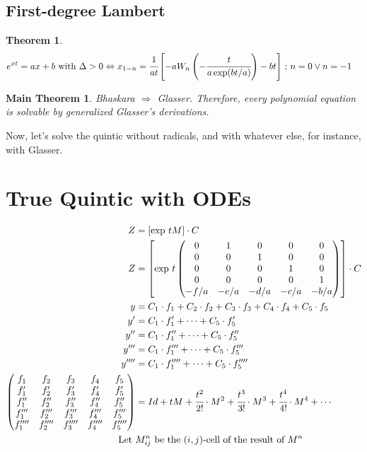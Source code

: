 \documentclass[12pt,a4paper]{article}
\newtheorem{thm}{Theorem}[section]
\newtheorem*{mainThm}{Main Theorem}
\begin{document}
\subsection{First-degree Lambert}

\begin{thm}
\begin{align}
e^{xt} &= ax + b\text{ with } \Delta > 0 \Leftrightarrow x_{1 - n} = \cfrac{1}{at} \left[ -aW_n \left( - \cfrac{t}{a \exp(bt/a)} \right) - bt \right]\,;\,n = 0 \vee n = -1
\end{align}
\end{thm}

\begin{mainThm}
Bhaskara $\Rightarrow$ Glasser. Therefore, every polynomial equation is solvable by generalized Glasser's derivations.
\end{mainThm}

\vspace{3mm}

Now, let's solve the quintic without radicals, and with whatever else, for instance, with Glasser.

 \section{True Quintic with ODEs}

\begin{align}
Z &= \left[ \exp\, t M \right] \cdot C \\
Z &= \left[ \exp\, t \left(\begin{matrix}0 & 1 & 0 & 0 & 0 \\ 0 & 0 & 1 & 0 & 0 \\ 0 & 0 & 0 & 1 & 0 \\ 0 & 0 & 0 & 0 & 1  \\ -f/a & -e/a & -d/a & -c/a & -b/a \end{matrix}\right) \right] \cdot C \\
 y &= C_1 \cdot f_1 + C_2 \cdot f_2 + C_3 \cdot f_3 + C_4 \cdot f_4 + C_5 \cdot f_5 \\
 y' &= C_1 \cdot f_1' + \cdots + C_5 \cdot f_5' \\
 y'' &= C_1 \cdot f_1'' + \cdots + C_5 \cdot f_5'' \\
 y''' &= C_1 \cdot f_1'''  + \cdots + C_5 \cdot f_5''' \\
 y'''' &= C_1 \cdot f_1''''  + \cdots + C_5 \cdot f_5'''' \\
 \left(\begin{matrix}f_1 & f_2 & f_3 & f_4 & f_5 \\ f_1' & f_2' & f_3' & f_4' & f_5' \\ f_1'' & f_2'' & f_3'' & f_4'' & f_5'' \\ f_1''' & f_2''' & f_3''' & f_4''' & f_5''' \\ f_1'''' & f_2'''' & f_3'''' & f_4'''' & f_5'''' \end{matrix}\right) &= Id + tM + \cfrac{t^2}{2!}\cdot M^2 + \cfrac{t^3}{3!}\cdot M^3 + \cfrac{t^4}{4!}\cdot M^4 + \cdots \\
 \text{Let } &M_{ij}^n \text{ be the }(i,j)\text{-cell of the result of } M^n \nonumber
\end{align}
\end{document}
